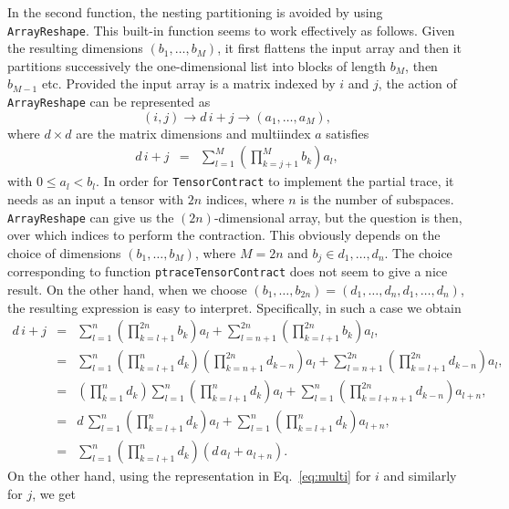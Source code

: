 \documentclass[nofootinbib,superscriptaddress,longbibliography,a4paper,amsfonts]{revtex4-2}
\begin{document}
In the second function, the nesting partitioning is avoided by using \verb+ArrayReshape+. This built-in function seems to work effectively as follows. Given the resulting dimensions $(b_1, \ldots, b_M)$, it first flattens the input array and then it partitions successively the one-dimensional list into blocks of length $b_M$, then $b_{M-1}$ etc. Provided the input array is a matrix indexed by $i$ and $j$, the action of \verb+ArrayReshape+ can be represented as
\begin{equation}
    (i,j) \to d \, i + j \to (a_1, \ldots, a_M),
\end{equation}
where $d \times d$ are the matrix dimensions and multiindex $a$ satisfies
\begin{eqnarray}
d \, i + j & = & \sum_{l=1}^{M} \left( \prod_{k=j+1}^{M} b_k \right) a_l,
\end{eqnarray}
with $0 \leq a_l < b_l$. In order for \verb+TensorContract+ to implement the partial trace, it needs as an input a tensor with $2 n$ indices, where $n$ is the number of subspaces. \verb+ArrayReshape+ can give us the $(2n)$-dimensional array, but the question is then, over which indices to perform the contraction. This obviously depends on the choice of dimensions $(b_1, \ldots, b_M)$, where $M = 2n$ and $b_j \in {d_1, \ldots, d_n}$. The choice corresponding to function \verb+ptraceTensorContract+ does not seem to give a nice result. On the other hand, when we choose $(b_1, \ldots, b_{2n}) = (d_1, \ldots, d_n, d_1, \ldots, d_n)$, the resulting expression is easy to interpret. Specifically, in such a case we obtain
\begin{eqnarray}
d \, i + j & = & \sum_{l=1}^{n} \left( \prod_{k=l+1}^{2n} b_k \right) a_l + \sum_{l=n+1}^{2n} \left( \prod_{k=l+1}^{2n} b_k \right) a_l, \\
& = & \sum_{l=1}^{n} \left( \prod_{k=l+1}^{n} d_k \right) \left( \prod_{k=n+1}^{2n} d_{k-n} \right) a_l + \sum_{l=n+1}^{2n} \left( \prod_{k=l+1}^{2n} d_{k-n} \right) a_l, \\
& = & \left( \prod_{k=1}^{n} d_{k} \right) \sum_{l=1}^{n} \left( \prod_{k=l+1}^{n} d_k \right) a_l + \sum_{l=1}^{n} \left( \prod_{k=l+n+1}^{2n} d_{k-n} \right) a_{l+n}, \\
& = & d \, \sum_{l=1}^{n} \left( \prod_{k=l+1}^{n} d_k \right) a_l + \sum_{l=1}^{n} \left( \prod_{k=l+1}^{n} d_{k} \right) a_{l+n}, \\
& = & \sum_{l=1}^{n} \left( \prod_{k=l+1}^{n} d_k \right) (d \, a_l + a_{l+n}). \label{eq:comp1}
\end{eqnarray}
On the other hand, using the representation in Eq.~\eqref{eq:multi} for $i$ and similarly for $j$, we get 
\end{document}
